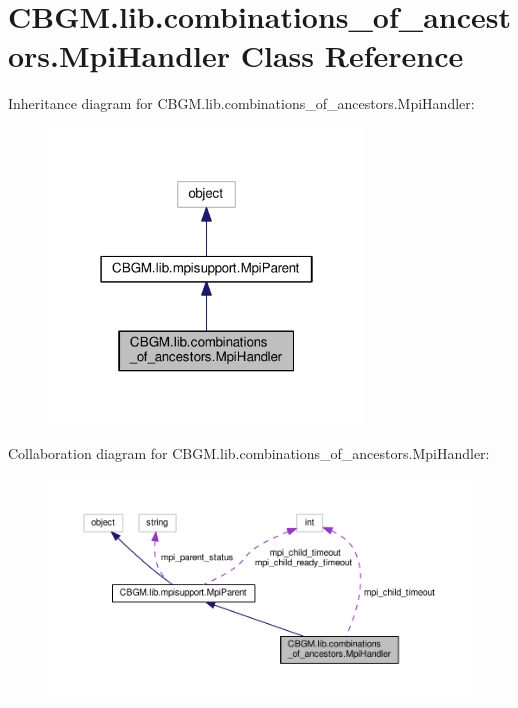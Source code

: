 \hypertarget{classCBGM_1_1lib_1_1combinations__of__ancestors_1_1MpiHandler}{}\section{C\+B\+G\+M.\+lib.\+combinations\+\_\+of\+\_\+ancestors.\+Mpi\+Handler Class Reference}
\label{classCBGM_1_1lib_1_1combinations__of__ancestors_1_1MpiHandler}


Inheritance diagram for C\+B\+G\+M.\+lib.\+combinations\+\_\+of\+\_\+ancestors.\+Mpi\+Handler\+:\nopagebreak
\begin{figure}[H]
\begin{center}
\leavevmode
\includegraphics[width=238pt]{classCBGM_1_1lib_1_1combinations__of__ancestors_1_1MpiHandler__inherit__graph}
\end{center}
\end{figure}


Collaboration diagram for C\+B\+G\+M.\+lib.\+combinations\+\_\+of\+\_\+ancestors.\+Mpi\+Handler\+:\nopagebreak
\begin{figure}[H]
\begin{center}
\leavevmode
\includegraphics[width=350pt]{classCBGM_1_1lib_1_1combinations__of__ancestors_1_1MpiHandler__coll__graph}
\end{center}
\end{figure}
